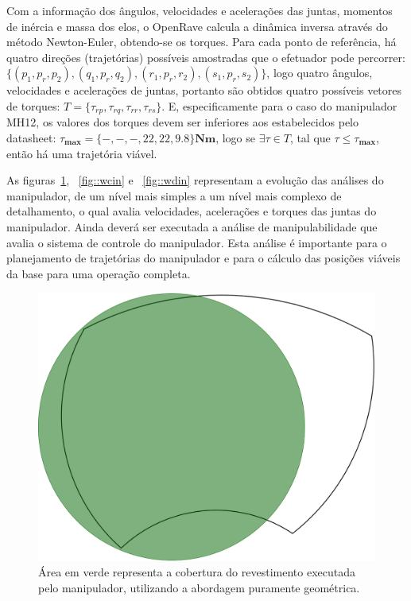 Com a informação dos ângulos, velocidades e acelerações das juntas, momentos
de inércia e massa dos elos, o OpenRave calcula a dinâmica inversa através do
método Newton-Euler, obtendo-se os torques. Para cada ponto de referência, há quatro direções
(trajetórias) possíveis amostradas que o efetuador pode percorrer:
$\{(p_1,p_r,p_2),(q_1,p_r,q_2),(r_1,p_r,r_2),(s_1,p_r,s_2)\}$, logo quatro
ângulos, velocidades e acelerações de juntas, portanto são obtidos quatro
possíveis vetores de torques:
$T=\{\tau_{rp},\tau_{rq},\tau_{rr},\tau_{rs}\}$. E, especificamente para o
caso do manipulador MH12, os valores dos torques devem ser inferiores aos
estabelecidos pelo datasheet:
$\tau_{\textbf{max}}=\{-,-,-,22,22,9.8\}\textbf{Nm}$, logo se $\exists \tau\in
T$, tal que $\tau\leq\tau_{\textbf{max}}$, então há uma trajetória viável.

As figuras~\ref{fig::wgeo}, ~\ref{fig::wcin} e ~\ref{fig::wdin} representam a
evolução das análises do manipulador, de um nível mais simples a um nível mais
complexo de detalhamento, o qual avalia velocidades, acelerações e torques das
juntas do manipulador. Ainda deverá ser executada a análise de manipulabilidade
que avalia o sistema de controle do manipulador. Esta análise é importante para
o planejamento de trajetórias do manipulador e para o cálculo das posições
viáveis da base para uma operação completa.



\begin{figure}[h!]	
	\includegraphics[width=\columnwidth]{detail/figs/dinamica/workspaceGeometrico.png}
	\caption{Área em verde representa a cobertura do revestimento executada pelo
	manipulador, utilizando a abordagem puramente geométrica.}
	\label{fig::wgeo}
\end{figure}

